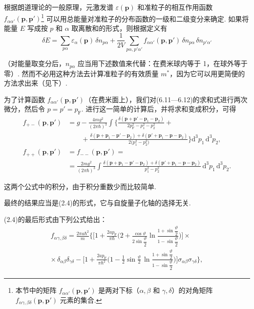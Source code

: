根据朗道理论的一般原理，元激发谱 $\varepsilon(\bm p)$ 和准粒子的相互作用函数 $f_{\alpha\alpha'}(\bm p,\bm p')$\footnote{本节中的矩阵 $f_{\alpha\alpha'}(\bm p,\bm p')$ 是两对下标（$\alpha,\beta$ 和 $\gamma,\delta$）的对角矩阵 $f_{\alpha\gamma,\beta\delta}(\bm p,\bm p')$ 元素的集合.} 可以用总能量对准粒子的分布函数的一级和二级变分来确定. 如果将能量 $E$ 写成按 $p$ 和 $\alpha$ 取离散和的形式，则根据定义有
\begin{equation}
\delta E=\sum_{p\alpha}\varepsilon_{\alpha}(\bm p)\,\delta n_{p\alpha}
+\frac{1}{2V}\sum_{p\alpha,p'\alpha'}f_{\alpha\alpha'}(\bm p,\bm p')\,\delta n_{p\alpha}\,\delta n_{p'\alpha'}
\end{equation}

（对能量取变分后，$n_{p\alpha}$ 应当用下述数值来代替：在费米球内等于 1，在球外等于零）. 然而不必用这种方法去计算准粒子的有效质量 $m^{*}$，因为它可以用更简便的方法求出来（见下）.

为了计算函数 $f_{\alpha\alpha'}(\bm p,\bm p')$（在费米面上），我们对(6.11—6.12)的求和式进行两次微分，然后令 $p=p'=p_{\mathrm F}$. 进行这一简单的计算后，并将求和变成积分，可得
\begin{equation*}
\begin{aligned}
f_{+-}(\bm p,\bm p')&=g-\frac{4mg^{2}}{(2\pi\hbar)^{3}}\int\biggl\{\frac{\delta(\bm p+\bm p'-\bm p_{1}-\bm p_{2})}{2p_{\mathrm F}^{2}-p_{1}^{2}-p_{2}^{2}}+\\
&\qquad+\frac{\delta(\bm p+\bm p_{1}-\bm p'-\bm p_{2})+\delta(\bm p'+\bm p_{1}-\bm p-\bm p_{2})}{2\bigl(p_{1}^{2}-p_{2}^{2}\bigr)}\biggr\}\mathrm{d}^{3}p_{1}\,\mathrm{d}^{3}p_{2},\\
f_{++}(\bm p,\bm p')&=f_{--}(\bm p,\bm p')=\\
&=\frac{2mg^{2}}{(2\pi\hbar)^{3}}\int\frac{\delta(\bm p+\bm p_{1}-\bm p'-\bm p_{2})+\delta(\bm p'+\bm p_{1}-\bm p-\bm p_{2})}{p_{1}^{2}-p_{2}^{2}}\,\mathrm{d}^{3}p_{1}\,\mathrm{d}^{3}p_{2}.
\end{aligned}
\end{equation*}

这两个公式中的积分，由于积分重数少而比较简单.

最终的结果应当是(2.4)的形式，它与自旋量子化轴的选择无关.

(2.4)的最后形式由下列公式给出：
\begin{align}
f_{\alpha\gamma,\beta\delta}=\frac{2\pi a\hbar^{2}}{m}\biggl\{\biggl[1+\frac{2ap_{\mathrm F}}{\pi\hbar}
\biggl(2+\frac{\cos\vartheta}{2\sin\dfrac{\vartheta}{2}}\ln\frac{1+\sin\dfrac{\vartheta}{2}}{1-\sin\dfrac{\vartheta}{2}}\biggr)\biggr]\times\nonumber\\
\times\,\delta_{\alpha\beta}\delta_{\gamma\delta}
-\biggl[1+\frac{2ap_{\mathrm F}}{\pi\hbar^{2}}\biggl(1-\frac{1}{2}\sin\frac{\vartheta}{2}\,\ln\frac{1+\sin\dfrac{\vartheta}{2}}{1-\sin\dfrac{\vartheta}{2}}\biggr)\biggr]\sigma_{\alpha\beta}\sigma_{\gamma\delta}\biggr\},
\end{align}

